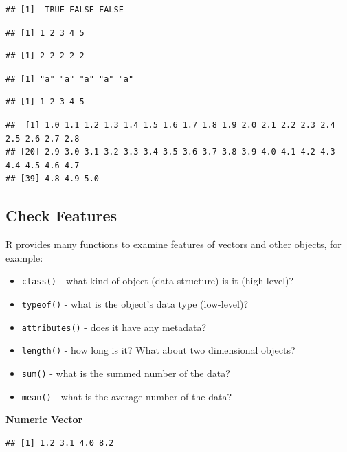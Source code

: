 \documentclass[
]{book}
\providecommand{\tightlist}{%
  \setlength{\itemsep}{0pt}\setlength{\parskip}{0pt}}
\begin{document}
\begin{verbatim}
## [1]  TRUE FALSE FALSE
\end{verbatim}

\begin{verbatim}
## [1] 1 2 3 4 5
\end{verbatim}

\begin{verbatim}
## [1] 2 2 2 2 2
\end{verbatim}

\begin{verbatim}
## [1] "a" "a" "a" "a" "a"
\end{verbatim}

\begin{verbatim}
## [1] 1 2 3 4 5
\end{verbatim}

\begin{verbatim}
##  [1] 1.0 1.1 1.2 1.3 1.4 1.5 1.6 1.7 1.8 1.9 2.0 2.1 2.2 2.3 2.4 2.5 2.6 2.7 2.8
## [20] 2.9 3.0 3.1 3.2 3.3 3.4 3.5 3.6 3.7 3.8 3.9 4.0 4.1 4.2 4.3 4.4 4.5 4.6 4.7
## [39] 4.8 4.9 5.0
\end{verbatim}

\hypertarget{check-features}{%
\subsection{Check Features}\label{check-features}}

R provides many functions to examine features of vectors and other objects, for example:

\begin{itemize}
\tightlist
\item
  \texttt{class()} - what kind of object (data structure) is it (high-level)?
\item
  \texttt{typeof()} - what is the object's data type (low-level)?
\item
  \texttt{attributes()} - does it have any metadata?
\item
  \texttt{length()} - how long is it? What about two dimensional objects?
\item
  \texttt{sum()} - what is the summed number of the data?
\item
  \texttt{mean()} - what is the average number of the data?
\end{itemize}

\textbf{Numeric Vector}

\begin{verbatim}
## [1] 1.2 3.1 4.0 8.2
\end{verbatim}
\end{document}
